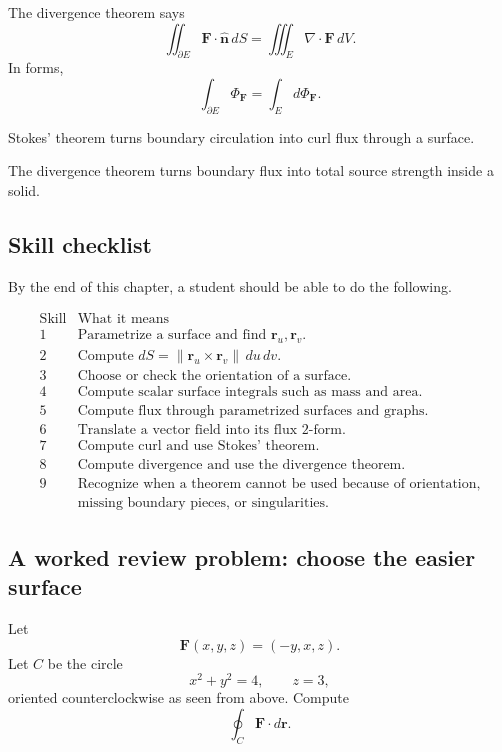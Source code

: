 The divergence theorem says
\[
\boxed{
    \iint_{\partial E}\mathbf F\cdot\widehat{\mathbf n}\,dS
    =
    \iiint_E\nabla\cdot\mathbf F\,dV.
}
\]
In forms,
\[
\boxed{
    \int_{\partial E}\Phi_{\mathbf F}
    =
    \int_E d\Phi_{\mathbf F}.
}
\]

Stokes' theorem turns boundary circulation into curl flux through a surface.

The divergence theorem turns boundary flux into total source strength inside a solid.

\subsection{Skill checklist}

By the end of this chapter, a student should be able to do the following.

\[
\begin{array}{c|l}
\text{Skill} & \text{What it means} \\ \hline
1 & \text{Parametrize a surface and find }\mathbf r_u,\mathbf r_v.\\[1mm]
2 & \text{Compute }dS=\|\mathbf r_u\times\mathbf r_v\|\,du\,dv.\\[1mm]
3 & \text{Choose or check the orientation of a surface.}\\[1mm]
4 & \text{Compute scalar surface integrals such as mass and area.}\\[1mm]
5 & \text{Compute flux through parametrized surfaces and graphs.}\\[1mm]
6 & \text{Translate a vector field into its flux }2\text{-form.}\\[1mm]
7 & \text{Compute curl and use Stokes' theorem.}\\[1mm]
8 & \text{Compute divergence and use the divergence theorem.}\\[1mm]
9 & \text{Recognize when a theorem cannot be used because of orientation,}\\
  & \text{missing boundary pieces, or singularities.}
\end{array}
\]

\subsection{A worked review problem: choose the easier surface}

Let
\[
    \mathbf F(x,y,z)=(-y,x,z).
\]
Let \(C\) be the circle
\[
    x^2+y^2=4,
    \qquad
    z=3,
\]
oriented counterclockwise as seen from above.  Compute
\[
    \oint_C \mathbf F\cdot d\mathbf r.
\]

